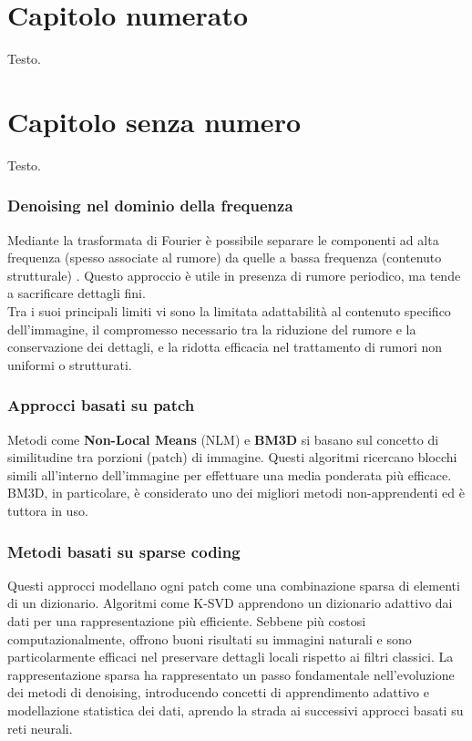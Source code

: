 \documentclass[12pt,a4paper,openright,twoside]{book}
\begin{document}
\tableofcontents

\chapter{Capitolo numerato}
Testo.

\chapter*{Capitolo senza numero}
Testo.


\subsection*{Denoising nel dominio della frequenza}
Mediante la trasformata di Fourier è possibile separare le componenti ad alta frequenza (spesso associate al rumore) da quelle a bassa frequenza (contenuto strutturale) \parencite{oppenheim1999discrete}. 
Questo approccio è utile in presenza di rumore periodico, ma tende a sacrificare dettagli fini.\\
Tra i suoi principali limiti vi sono la limitata adattabilità al contenuto specifico dell'immagine, il compromesso necessario tra la riduzione del rumore e la conservazione dei dettagli, e la ridotta efficacia nel trattamento di rumori non uniformi o strutturati.

\subsection*{Approcci basati su patch}
Metodi come \textbf{Non-Local Means} (NLM) \parencite{buades2005nonlocal} e \textbf{BM3D} \parencite{dabov2007bm3d} si basano sul concetto di similitudine tra porzioni (patch) di immagine. Questi algoritmi ricercano blocchi simili all'interno dell'immagine per effettuare una media ponderata più efficace. BM3D, in particolare, è considerato uno dei migliori metodi non-apprendenti ed è tuttora in uso.

\subsection*{Metodi basati su sparse coding}
Questi approcci modellano ogni patch come una combinazione sparsa di elementi di un dizionario. Algoritmi come K-SVD \parencite{aharon2006ksvd, wang2020_review, cloud_ksvd2023} apprendono un dizionario adattivo dai dati per una rappresentazione più efficiente. Sebbene più costosi computazionalmente, offrono buoni risultati su immagini naturali e sono particolarmente efficaci nel preservare dettagli locali rispetto ai filtri classici.
\whiteline
La rappresentazione sparsa ha rappresentato un passo fondamentale nell'evoluzione dei metodi di denoising, introducendo concetti di apprendimento adattivo e modellazione statistica dei dati, aprendo la strada ai successivi approcci basati su reti neurali.
\end{document}
